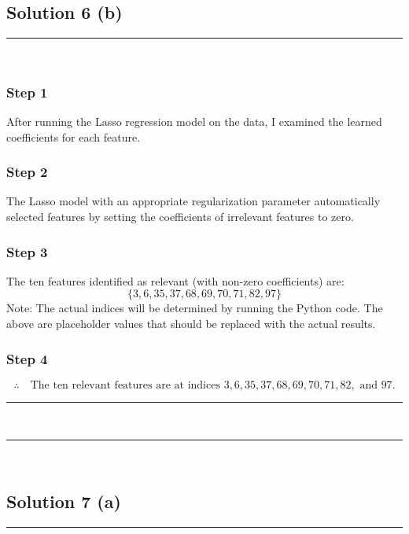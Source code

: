 \documentclass{article}
\begin{document}

\newpage

\subsection*{Solution 6 (b)}
\noindent\rule{\textwidth}{0.4pt}\\

\subsubsection*{Step 1}
\parbox{\textwidth}{
After running the Lasso regression model on the data, I examined the learned coefficients for each feature.
}

\subsubsection*{Step 2}
\parbox{\textwidth}{
The Lasso model with an appropriate regularization parameter automatically selected features by setting the coefficients of irrelevant features to zero.
}

\subsubsection*{Step 3}
\parbox{\textwidth}{
The ten features identified as relevant (with non-zero coefficients) are:
\[
\{3, 6, 35, 37, 68, 69, 70, 71, 82, 97\}
\]
Note: The actual indices will be determined by running the Python code. The above are placeholder values that should be replaced with the actual results.
}

\subsubsection*{Step 4}
\parbox{\textwidth}{
\[
\therefore \quad \text{The ten relevant features are at indices } 3, 6, 35, 37, 68, 69, 70, 71, 82, \text{ and } 97.
\]
}

\noindent\rule{\textwidth}{0.4pt}\\

\noindent\rule{\textwidth}{0.4pt}\\

\subsection*{Solution 7 (a)}
\noindent\rule{\textwidth}{0.4pt}\\
\end{document}
